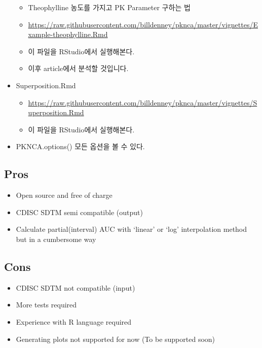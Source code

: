 \documentclass[12pt,]{krantz}
\providecommand{\tightlist}{%
  \setlength{\itemsep}{0pt}\setlength{\parskip}{0pt}}
\begin{document}
\begin{itemize}
  \begin{itemize}
  \tightlist
  \item
    Theophylline 농도를 가지고 PK Parameter 구하는 법
  \item
    \url{https://raw.githubusercontent.com/billdenney/pknca/master/vignettes/Example-theophylline.Rmd}
  \item
    이 파일을 RStudio에서 실행해본다.
  \item
    이후 article에서 분석할 것입니다.
  \end{itemize}
\item
  Superposition.Rmd

  \begin{itemize}
  \tightlist
  \item
    \url{https://raw.githubusercontent.com/billdenney/pknca/master/vignettes/Superposition.Rmd}
  \item
    이 파일을 RStudio에서 실행해본다.
  \end{itemize}
\item
  PKNCA.options() 모든 옵션을 볼 수 있다.
\end{itemize}

\hypertarget{pros-1}{%
\subsection{Pros}\label{pros-1}}

\begin{itemize}
\tightlist
\item
  Open source and free of charge
\item
  CDISC SDTM semi compatible (output)
\item
  Calculate partial(interval) AUC with `linear' or `log' interpolation method but in a cumbersome way
\end{itemize}

\hypertarget{cons-1}{%
\subsection{Cons}\label{cons-1}}

\begin{itemize}
\tightlist
\item
  CDISC SDTM not compatible (input)
\item
  More tests required
\item
  Experience with R language required
\item
  Generating plots not supported for now (To be supported soon)
\end{itemize}
\end{document}
